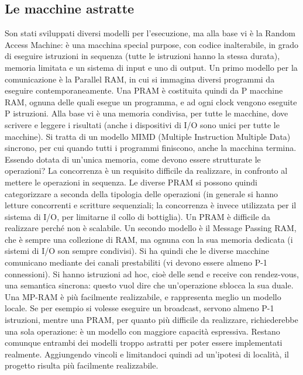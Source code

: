 \subsection{Le macchine astratte}
Son stati sviluppati diversi modelli per l'esecuzione, ma alla base vi è la Random Access Machine: è una macchina
special purpose, con codice inalterabile, in grado di eseguire istruzioni in sequenza (tutte le istruzioni hanno la
stessa durata), memoria limitata e un sistema di input e uno di output.
Un primo modello per la comunicazione è la Parallel RAM, in cui si immagina diversi programmi da eseguire
contemporaneamente. Una PRAM è costituita quindi da P macchine RAM, ognuna delle quali esegue un programma, e ad ogni
clock vengono eseguite P istruzioni. Alla base vi è una memoria condivisa, per tutte le macchine, dove scrivere e
leggere i risultati (anche i dispositivi di I/O sono unici per tutte le 
macchine). Si tratta di un modello MIMD (Multiple Instruction Multiple Data)
sincrono, per cui quando tutti i programmi finiscono, anche la macchina termina. Essendo dotata di un'unica memoria,
come devono essere strutturate le operazioni? La concorrenza è un requisito difficile da realizzare, in confronto al
mettere le operazioni in sequenza. Le diverse PRAM si possono quindi categorizzare a seconda della tipologia delle
operazioni (in generale si hanno letture concorrenti e scritture sequenziali; la concorrenza è invece utilizzata per 
il sistema di I/O, per limitarne il collo di bottiglia). Un PRAM è difficile da realizzare perché non è scalabile.
Un secondo modello è il Message Passing RAM, che è sempre una collezione di RAM, ma ognuna con la sua memoria dedicata
(i sistemi di I/O son sempre condivisi). Si ha quindi che le diverse macchine comunicano mediante dei canali
prestabiliti (vi devono essere almeno P-1 connessioni). Si hanno istruzioni ad hoc, cioè delle send e receive con
rendez-vous, una semantica sincrona: questo vuol dire che un'operazione sblocca la sua duale. Una MP-RAM è più
facilmente realizzabile, e rappresenta meglio un modello locale. Se per esempio si volesse eseguire un broadcast,
servono almeno P-1 istruzioni, mentre una PRAM, per quanto più difficile da realizzare, richiederebbe una sola
operazione: è un modello con maggiore capacità espressiva. Restano comunque entrambi dei modelli troppo astratti per
poter essere implementati realmente. Aggiungendo vincoli e limitandoci quindi ad un'ipotesi di località, il progetto
risulta più facilmente realizzabile.
